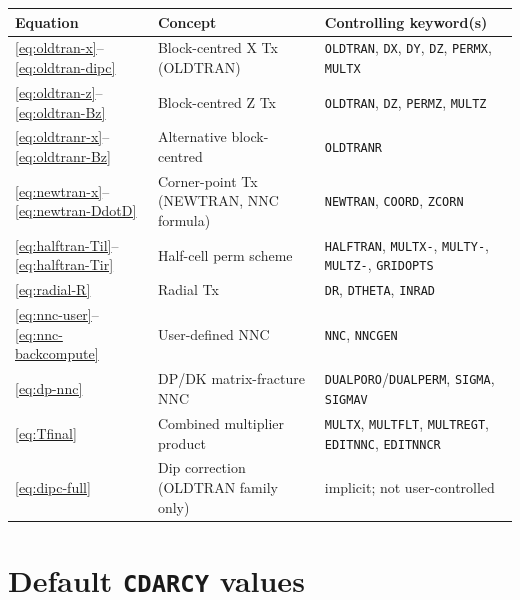 \documentclass[11pt,a4paper]{article}
\newcommand{\kw}[1]{\texttt{#1}}
\begin{document}
\begin{center}\small
\begin{tabular}{lll}
\toprule
Equation & Concept & Controlling keyword(s) \\
\midrule
\eqref{eq:oldtran-x}--\eqref{eq:oldtran-dipc} & Block-centred X Tx (OLDTRAN)             & \kw{OLDTRAN}, \kw{DX}, \kw{DY}, \kw{DZ}, \kw{PERMX}, \kw{MULTX} \\
\eqref{eq:oldtran-z}--\eqref{eq:oldtran-Bz}   & Block-centred Z Tx                       & \kw{OLDTRAN}, \kw{DZ}, \kw{PERMZ}, \kw{MULTZ}                  \\
\eqref{eq:oldtranr-x}--\eqref{eq:oldtranr-Bz} & Alternative block-centred                & \kw{OLDTRANR}                                                  \\
\eqref{eq:newtran-x}--\eqref{eq:newtran-DdotD} & Corner-point Tx (NEWTRAN, NNC formula)  & \kw{NEWTRAN}, \kw{COORD}, \kw{ZCORN}                            \\
\eqref{eq:halftran-Til}--\eqref{eq:halftran-Tir} & Half-cell perm scheme                 & \kw{HALFTRAN}, \kw{MULTX-}, \kw{MULTY-}, \kw{MULTZ-}, \kw{GRIDOPTS} \\
\eqref{eq:radial-R}                            & Radial Tx                              & \kw{DR}, \kw{DTHETA}, \kw{INRAD}                                \\
\eqref{eq:nnc-user}--\eqref{eq:nnc-backcompute} & User-defined NNC                       & \kw{NNC}, \kw{NNCGEN}                                            \\
\eqref{eq:dp-nnc}                              & DP/DK matrix-fracture NNC               & \kw{DUALPORO}/\kw{DUALPERM}, \kw{SIGMA}, \kw{SIGMAV}             \\
\eqref{eq:Tfinal}                              & Combined multiplier product            & \kw{MULTX}, \kw{MULTFLT}, \kw{MULTREGT}, \kw{EDITNNC}, \kw{EDITNNCR} \\
\eqref{eq:dipc-full}                           & Dip correction (OLDTRAN family only)    & implicit; not user-controlled                                   \\
\bottomrule
\end{tabular}
\end{center}

\section{Default \kw{CDARCY} values}
\end{document}
